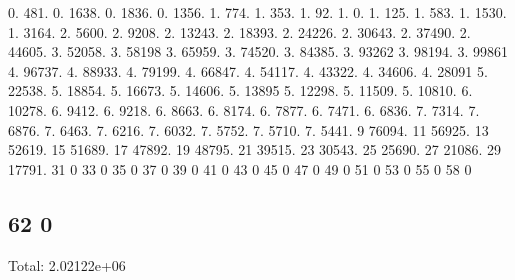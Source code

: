 0. 481. 0. 1638. 0. 1836. 0. 1356. 1. 774. 1. 353. 1. 92. 1. 0. 1. 125. 1. 583. 1. 1530. 1. 3164. 2. 5600. 2. 9208. 2. 13243. 2. 18393. 2. 24226. 2. 30643. 2. 37490. 2. 44605. 3. 52058. 3. 58198 3. 65959. 3. 74520. 3. 84385. 3. 93262 3. 98194. 3. 99861 4. 96737. 4. 88933. 4. 79199. 4. 66847. 4. 54117. 4. 43322. 4. 34606. 4. 28091 5. 22538. 5. 18854. 5. 16673. 5. 14606. 5. 13895 5. 12298. 5. 11509. 5. 10810. 6. 10278. 6. 9412. 6. 9218. 6. 8663. 6. 8174. 6. 7877. 6. 7471. 6. 6836. 7. 7314. 7. 6876. 7. 6463. 7. 6216. 7. 6032. 7. 5752. 7. 5710. 7. 5441. 9 76094. 11 56925. 13 52619. 15 51689. 17 47892. 19 48795. 21 39515. 23 30543. 25 25690. 27 21086. 29 17791. 31 0 33 0 35 0 37 0 39 0 41 0 43 0 45 0 47 0 49 0 51 0 53 0 55 0 58 0 \subsection*{62 0 }

Total\+: 2.\+02122e+06 